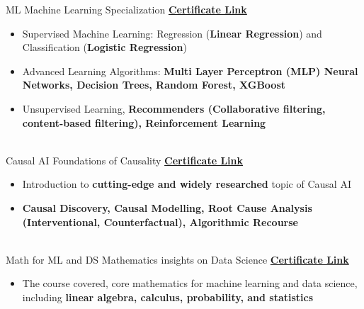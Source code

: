 \documentclass[letterpaper]{DS_class_file} %
\begin{document}
\begin{twenty} %
	\twentyitem
    {ML}
	{}
	{\hspace{0.3cm} Machine Learning Specialization}
    {\href{https://coursera.org/share/ff6e7764bffa429050b673b4cad74ae5} {\textbf{Certificate Link}}}
	{}
	{
		{\begin{itemize}
            \item Supervised Machine Learning: Regression (\textbf{Linear Regression}) and Classification (\textbf{Logistic Regression})
            \item Advanced Learning Algorithms: \textbf{Multi Layer Perceptron (MLP) Neural Networks, Decision Trees, Random Forest, XGBoost} 
            \item Unsupervised Learning, \textbf{Recommenders (Collaborative filtering, content-based filtering), Reinforcement Learning}
		\end{itemize}}
	}
	\\
	\twentyitem
	{Causal AI}
	{}
    {\hspace{0.3cm} Foundations of Causality}
	{\href{https://causalens-foundations-of-causality-certificates.s3.amazonaws.com/a698fab1-0028-4e12-a2a4-5986c7ac6c8d.png} {\textbf{Certificate Link}}}
	{}
	{
		{\begin{itemize}
            \item Introduction to \textbf{cutting-edge and widely researched} topic of Causal AI
            \item \textbf{Causal Discovery, Causal Modelling, Root Cause Analysis (Interventional, Counterfactual), Algorithmic Recourse} 
		\end{itemize}}
	}
	\\
    \twentyitem
	{Math for}
	{ML and DS}
    {\hspace{0.3cm} Mathematics insights on Data Science}
	{\href{https://coursera.org/share/a5ca8400ac0a60d8aeee64f91816d879}{\textbf{Certificate Link}}}
	{}
	{\begin{itemize}
			\item The course covered, core mathematics for machine learning and data science, including \textbf{linear algebra, calculus, probability, and statistics}
	\end{itemize}}

\end{twenty}
\end{document}
